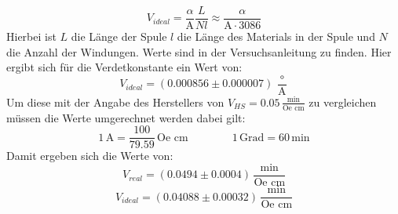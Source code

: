 \begin{equation}
	V_{ideal}=\frac{\alpha}{\text{A}}\frac{L}{Nl}\approx \frac{\alpha}{\text{A}\cdot 3086}
	\label{idealH}
\end{equation}
Hierbei ist $L$ die Länge der Spule $l$ die Länge des Materials in der Spule und $N$ die Anzahl der Windungen. Werte sind in der Versuchsanleitung zu finden\cite{anleitung}. Hier ergibt sich für die Verdetkonstante ein Wert von:
$$V_{ideal}=(0.000856 \pm 0.000007)\,\frac{\circ}{\text{A}}$$
Um diese mit der Angabe des Herstellers von $V_{HS}=0.05\,\frac{\text{min}}{\text{Oe cm}}$ zu vergleichen müssen die Werte umgerechnet werden dabei gilt:
$$1\,\text{A}=\frac{100}{79.59}\,\text{Oe cm}  \qquad \qquad 1\,\text{Grad}=60\,\text{min}$$
Damit ergeben sich die Werte von:
$$V_{real}=(0.0494 \pm 0.0004)\,\frac{\text{min}}{\text{Oe cm}}$$
$$V_{ideal}=(0.04088 \pm 0.00032)\,\frac{\text{min}}{\text{Oe cm}}$$